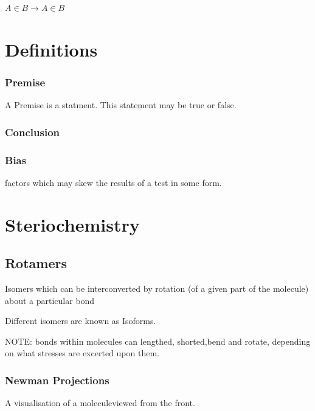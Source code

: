 \documentclass[]{article}
\begin{document}
\(A \in B \rightarrow A \in B\)

\hypertarget{definitions}{%
\section{Definitions}\label{definitions}}

\hypertarget{premise}{%
\subsubsection{Premise}\label{premise}}

A Premise is a statment. This statement may be true or false.

\hypertarget{conclusion}{%
\subsubsection{Conclusion}\label{conclusion}}

\hypertarget{bias}{%
\subsubsection{Bias}\label{bias}}

factors which may skew the results of a test in some form.

\hypertarget{steriochemistry}{%
\section{Steriochemistry}\label{steriochemistry}}

\hypertarget{rotamers}{%
\subsection{Rotamers}\label{rotamers}}

Isomers which can be interconverted by rotation (of a given part of the
molecule) about a particular bond

Different isomers are known as Isoforms.

NOTE: bonds within molecules can lengthed, shorted,bend and rotate,
depending on what stresses are excerted upon them.

\hypertarget{newman-projections}{%
\subsubsection{Newman Projections}\label{newman-projections}}

A visualisation of a moleculeviewed from the front.
\end{document}
